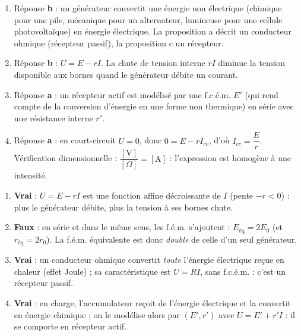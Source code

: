 \documentclass[11pt]{article}
\begin{document}
\begin{corrige}
\begin{enumerate}
\item Réponse \textbf{b} : un générateur convertit une énergie non électrique (chimique pour une pile, mécanique pour un alternateur, lumineuse pour une cellule photovoltaïque) en énergie électrique. La proposition a décrit un conducteur ohmique (récepteur passif), la proposition c un récepteur.
\item Réponse \textbf{b} : $U = E - rI$. La chute de tension interne $rI$ diminue la tension disponible aux bornes quand le générateur débite un courant.
\item Réponse \textbf{a} : un récepteur actif est modélisé par une f.c.é.m. $E'$ (qui rend compte de la conversion d'énergie en une forme non thermique) en série avec une résistance interne $r'$.
\item Réponse \textbf{a} : en court-circuit $U = 0$, donc $0 = E - rI_{cc}$, d'où $I_{cc} = \dfrac{E}{r}$. Vérification dimensionnelle : $\dfrac{[\text{V}]}{[\Omega]} = [\text{A}]$ : l'expression est homogène à une intensité.
\end{enumerate}
\end{corrige}

\begin{corrige}
\begin{enumerate}
\item \textbf{Vrai} : $U = E - rI$ est une fonction affine décroissante de $I$ (pente $-r < 0$) : plus le générateur débite, plus la tension à ses bornes chute.
\item \textbf{Faux} : en série et dans le même sens, les f.é.m. s'ajoutent : $E_{\text{éq}} = 2E_0$ (et $r_{\text{éq}} = 2r_0$). La f.é.m. équivalente est donc \emph{double} de celle d'un seul générateur.
\item \textbf{Vrai} : un conducteur ohmique convertit \emph{toute} l'énergie électrique reçue en chaleur (effet Joule) ; sa caractéristique est $U = RI$, sans f.c.é.m. : c'est un récepteur passif.
\item \textbf{Vrai} : en charge, l'accumulateur reçoit de l'énergie électrique et la convertit en énergie chimique ; on le modélise alors par $(E', r')$ avec $U = E' + r'I$ : il se comporte en récepteur actif.
\end{enumerate}
\end{corrige}
\end{document}
